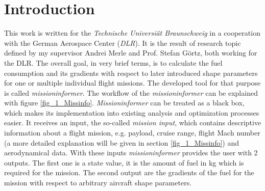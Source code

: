 

\chapter{Introduction}
\label{chap_1_Intro}
This work is written for the \emph{Technische Universiät Braunschweig}
in a cooperation with the German Aerospace Center (\emph{DLR}).
It is the result of research topic defined by my supervisor 
Andrei Merle and Prof. Stefan Görtz, both working for the DLR. The overall goal, 
in very brief terms, is to calculate the fuel consumption 
and its gradients with respect to later introduced shape parameters 
for one or multiple individual flight missions. The developed tool for that purpose 
is called \emph{missioninformer}.
The workflow of the \emph{missioninformer} can be explained  
with figure \ref{fig_1_Missinfo}. \emph{Missioninformer}
can be treated as a black box, which makes its implementation into 
existing analysis and optimization processes
easier. It receives an input, the so-called 
\emph{mission input}, which contains descriptive information about 
a flight mission, e.g. payload, cruise range, flight Mach number (a 
more detailed explanation will be given in section \ref{fig_1_Missinfo})
and aerodynamical data.
With these inputs \emph{missioninformer} provides the user with 2 outputs.
The first one is a state value, it is the amount of fuel in kg which is 
required for the mission. The second output are the gradients of 
the fuel for the mission with respect to arbitrary aircraft 
shape parameters. \newline


